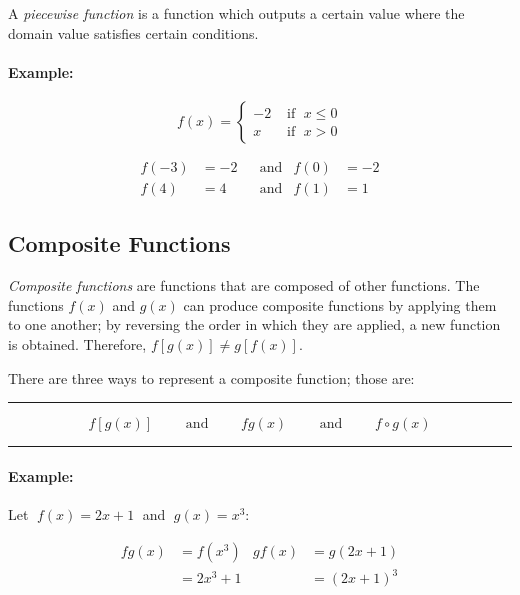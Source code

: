 \documentclass[a5paper,9pt]{book}
\theoremstyle{definition}
\newcommand{\txtlinesur}[1]{%
    \vspace*{\baselineskip}

    \hrule%

    \vspace*{\medskipamount}

    #1

    \vspace*{\medskipamount}

    \hrule%

    \vspace*{\baselineskip}
}
\begin{document}
        A \emph{piecewise function} is a function which outputs a certain value where
        the domain value satisfies certain conditions.

        \paragraph{Example:}

        \begin{equation*}
            f(x) =
                \begin{cases}
                    -2 & \text{ if }\; x \leq 0 \\
                    x & \text{ if }\; x > 0
                \end{cases}
        \end{equation*}

        \begin{align*}
            f(-3) &= -2 & &\text{and} & f(0) &= -2 \\
            f(4) &= 4 & &\text{and} & f(1) &= 1
        \end{align*}

        \subsection{Composite Functions}

        \emph{Composite functions} are functions that are composed of other functions.
        The functions $f(x)$ and $g(x)$ can produce composite functions by applying them
        to one another; by reversing the order in which they are applied, a new function
        is obtained. Therefore, $f\left[g(x)\right]\neq g\left[f(x)\right]$.

        There are three ways to represent a composite function; those are:

        \txtlinesur{%
            \begin{equation*}
                f\left[g(x)\right] \qquad\text{ and }\qquad fg(x) \qquad\text{ and }\qquad f\circ g(x)
            \end{equation*}
        }

        \paragraph{Example:} Let $\;f(x) = 2x + 1\;$ and $\;g(x) = x^3$:

        \begin{align*}
            fg(x) &= f(x^3) & gf(x) &= g(2x + 1) \\
                  &= 2x^3 + 1 & &= {(2x + 1)}^3
        \end{align*}
\end{document}
